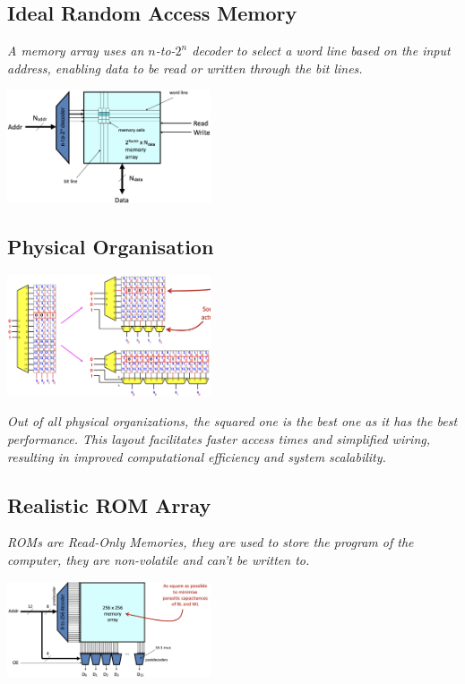 \subsection{Ideal Random Access Memory}
\textit{A memory array uses an \(n\)-to-\(2^n\) decoder to select a word line based on the input address, enabling data to be read or written through the bit lines.}
\begin{center}
    \includegraphics[width=0.45\textwidth]{chapters/chapter1c/images/ideal_ram.png}
\end{center}
\subsection{Physical Organisation }
\begin{center}
    \includegraphics[width=0.45\textwidth]{chapters/chapter1c/images/organisation.png}
\end{center}
\textit{Out of all physical organizations, the squared one is the best one as it has the best performance. This layout facilitates faster access times and simplified wiring, resulting in improved computational efficiency and system scalability.}
\subsection{Realistic ROM Array}
\textit{ROMs are Read-Only Memories, they are used to store the program of the computer, they are non-volatile and can't be written to.} \\ \vspace*{5px}
\begin{center}
    \includegraphics[width=0.45\textwidth]{chapters/chapter1c/images/rom.png}
\end{center}

